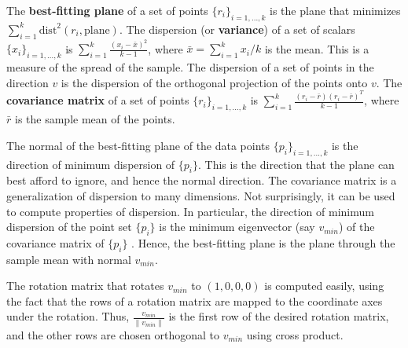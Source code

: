 \begin{defn2}
The {\bf best-fitting plane} of a set of points $\{r_i\}_{i=1,\ldots,k}$
is the plane that minimizes $\sum_{i=1}^k \mbox{dist}^2 (r_i,\mbox{plane})$.
The dispersion (or {\bf variance}) of a set of scalars
$\{x_i\}_{i=1,\ldots,k}$ is $\sum_{i=1}^k \frac{(x_i -
\bar{x})^2}{k-1}$, where $\bar{x} = \sum_{i=1}^k x_i / k$ is the mean.
This is a measure of the spread of the sample.
The dispersion of a set of points in the direction $v$ is the dispersion
of the orthogonal projection of the points onto $v$.
The {\bf covariance matrix} of a set of points $\{r_i\}_{i=1,\ldots,k}$ 
is $\sum_{i=1}^k \frac{(r_i - \bar{r})(r_i - \bar{r})^T}{k-1}$,
where $\bar{r}$ is the sample mean of the points.
\end{defn2}

The normal of the best-fitting plane of the data points $\{p_i\}_{i=1,\ldots,k}$
is the direction of minimum dispersion of $\{p_i\}$.
This is the direction that the plane can best afford to ignore,
and hence the normal direction.
The covariance matrix is a generalization of dispersion to many dimensions.
Not surprisingly, it can be used to compute properties of dispersion.
In particular, the direction of minimum dispersion of 
the point set $\{p_i\}$ is the minimum 
eigenvector (say $v_{min}$) of the covariance matrix of $\{p_i\}$ \cite{ballard82}.
Hence, the best-fitting plane is the plane through the sample mean
with normal $v_{min}$.

The rotation matrix that rotates $v_{min}$
to $(1,0,0,0)$ is computed easily, using the fact that the rows
of a rotation matrix are mapped to the coordinate axes under the
rotation.
Thus, $\frac{v_{min}}{\|v_{min}\|}$ is the first row of the desired rotation matrix,
and the other rows are chosen orthogonal to $v_{min}$ using
cross product.

